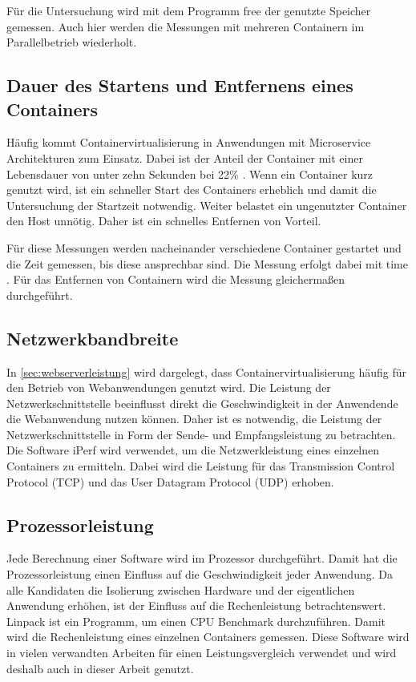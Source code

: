 Für die Untersuchung wird mit dem Programm free \cite[vgl.][]{procps.20200215} der genutzte Speicher gemessen. Auch hier werden die Messungen mit mehreren Containern im Parallelbetrieb wiederholt.

\subsection{Dauer des Startens und Entfernens eines Containers}
Häufig kommt Containervirtualisierung in Anwendungen mit Microservice Architekturen zum Einsatz. Dabei ist der Anteil der Container mit einer Lebensdauer von unter zehn Sekunden bei 22\% \cite[vgl.][23]{sysdig.2019}. Wenn ein Container kurz genutzt wird, ist ein schneller Start des Containers erheblich und damit die Untersuchung der Startzeit notwendig. Weiter belastet ein ungenutzter Container den Host unnötig. Daher ist ein schnelles Entfernen von Vorteil.

Für diese Messungen werden nacheinander verschiedene Container gestartet und die Zeit gemessen, bis diese ansprechbar sind. Die Messung erfolgt dabei mit time \cite[vgl.][]{die.net.}.
Für das Entfernen von Containern wird die Messung gleichermaßen durchgeführt.

\subsection{Netzwerkbandbreite}
In \ref{sec:webserverleistung} wird dargelegt, dass Containervirtualisierung häufig für den Betrieb von Webanwendungen genutzt wird. Die Leistung der Netzwerkschnittstelle beeinflusst direkt die Geschwindigkeit in der Anwendende die Webanwendung nutzen können. Daher ist es notwendig, die Leistung der Netzwerkschnittstelle in Form der Sende- und Empfangsleistung zu betrachten.  Die Software iPerf \cite[vgl.][]{Gueant.20200220} wird verwendet, um die Netzwerkleistung eines einzelnen Containers zu ermitteln. Dabei wird die Leistung für das Transmission Control Protocol (TCP) und das User Datagram Protocol (UDP) erhoben.

\subsection{Prozessorleistung}
Jede Berechnung einer Software wird im Prozessor durchgeführt. Damit hat die Prozessorleistung einen Einfluss auf die Geschwindigkeit jeder Anwendung. Da alle Kandidaten die Isolierung zwischen Hardware und der eigentlichen Anwendung erhöhen, ist der Einfluss auf die Rechenleistung betrachtenswert.
Linpack \cite[vgl.][]{Netlib.20090217} ist ein Programm, um einen CPU Benchmark durchzuführen. Damit wird die Rechenleistung eines einzelnen Containers gemessen. Diese Software wird in vielen verwandten Arbeiten für einen Leistungsvergleich verwendet \cite[vgl.][]{Morabito.2015, Felter.2015, Jain.1991} und wird deshalb auch in dieser Arbeit genutzt.

